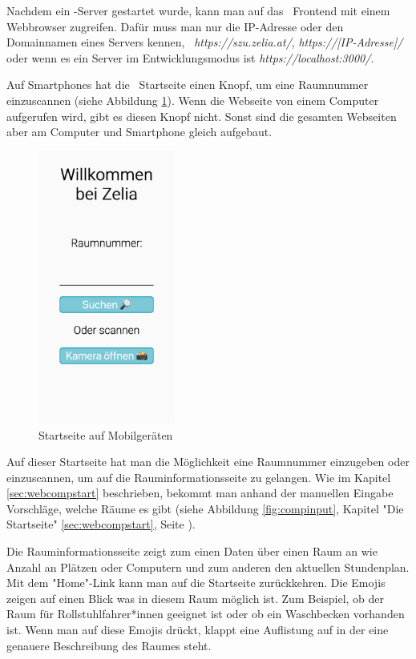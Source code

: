Nachdem ein \ZELIA-Server gestartet wurde, kann man auf das \ZELIA\ Frontend mit einem Webbrowser zugreifen. Dafür muss man nur die IP-Adresse oder den Domainnamen eines Servers kennen, \zb\ \emph{https://szu.zelia.at/}, \emph{https://[IP-Adresse]/} oder wenn es ein Server im Entwicklungsmodus ist \emph{https://localhost:3000/}.

Auf Smartphones hat die \ZELIA\ Startseite einen Knopf, um eine Raumnummer einzuscannen (siehe Abbildung \ref{fig:zeliastart}). Wenn die Webseite von einem Computer aufgerufen wird, gibt es diesen Knopf nicht. Sonst sind die gesamten Webseiten aber am Computer und Smartphone gleich aufgebaut.

\begin{figure}[H]
    \centering
    \includegraphics[height=90mm]{media/Handbuch/zelia_start.png}
    \caption{Startseite auf Mobilgeräten}
    \label{fig:zeliastart}
\end{figure}

Auf dieser Startseite hat man die Möglichkeit eine Raumnummer einzugeben oder einzuscannen, um auf die Rauminformationsseite zu gelangen. Wie im Kapitel \ref{sec:webcompstart} beschrieben, bekommt man anhand der manuellen Eingabe Vorschläge, welche Räume es gibt (siehe Abbildung \ref{fig:compinput}, Kapitel "Die Startseite" \ref{sec:webcompstart}, Seite \pageref{sec:webcompstart}). 

Die Rauminformationsseite zeigt zum einen Daten über einen Raum an wie Anzahl an Plätzen oder Computern und zum anderen den aktuellen Stundenplan. Mit dem "Home"-Link kann man auf die Startseite zurückkehren. Die Emojis zeigen auf einen Blick was in diesem Raum möglich ist. Zum Beispiel, ob der Raum für Rollstuhlfahrer*innen geeignet ist oder ob ein Waschbecken vorhanden ist. Wenn man auf diese Emojis drückt, klappt eine Auflistung auf in der eine genauere Beschreibung des Raumes steht.

